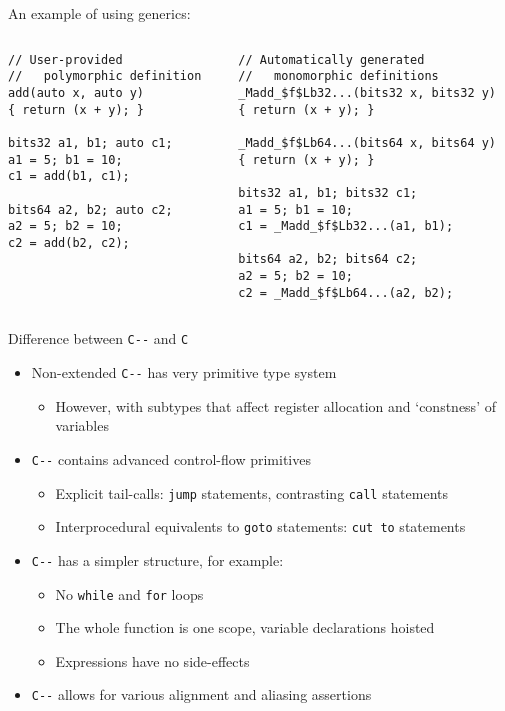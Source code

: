 \documentclass[aspectratio=169]{beamer}
\newcommand{\li}[1]{\lstinline{#1}}
\def\cmm{\texttt{C-\relax-}}
\begin{document}
\begin{frame}[fragile]
  \centering
  An example of using generics:
  \begin{columns}
    \begin{column}{.5\linewidth}\small
    \begin{lstlisting}
// User-provided
//   polymorphic definition
add(auto x, auto y)
{ return (x + y); }

bits32 a1, b1; auto c1;
a1 = 5; b1 = 10;
c1 = add(b1, c1);

bits64 a2, b2; auto c2;
a2 = 5; b2 = 10;
c2 = add(b2, c2);
    \end{lstlisting}
    \end{column}%
    \begin{column}{.5\linewidth}\small
    \begin{lstlisting}
// Automatically generated
//   monomorphic definitions
_Madd_$f$Lb32...(bits32 x, bits32 y)
{ return (x + y); }

_Madd_$f$Lb64...(bits64 x, bits64 y)
{ return (x + y); }

bits32 a1, b1; bits32 c1;
a1 = 5; b1 = 10;
c1 = _Madd_$f$Lb32...(a1, b1);

bits64 a2, b2; bits64 c2;
a2 = 5; b2 = 10;
c2 = _Madd_$f$Lb64...(a2, b2);
    \end{lstlisting}
    \end{column}
  \end{columns}
\end{frame}


\begin{frame}{Difference between \cmm{} and \texttt{C}}
  \begin{itemize}
    \item Non-extended \cmm{} has very primitive type system
    \begin{itemize}
      \item However, with subtypes that affect register allocation and `constness' of variables
    \end{itemize} 
    \item \cmm{} contains advanced control-flow primitives
    \begin{itemize}
      \item Explicit tail-calls: \li{jump} statements, contrasting \li{call} statements
      \item Interprocedural equivalents to \li{goto} statements: \li{cut to} statements
    \end{itemize}
    \item \cmm{} has a simpler structure, for example:
    \begin{itemize}
      \item No \li{while} and \li{for} loops
      \item The whole function is one scope, variable declarations hoisted
      \item Expressions have no side-effects
    \end{itemize}
    \item \cmm{} allows for various alignment and aliasing assertions
  \end{itemize}
\end{frame}
\end{document}
